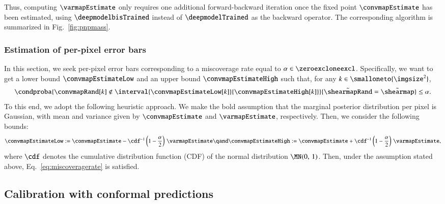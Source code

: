 \documentclass{aa}
\begin{document}
Thus, computing $\varmapEstimate$ only requires one additional forward-backward iteration once the fixed point $\convmapEstimate$ has been estimated, using $\deepmodelbisTrained$ instead of $\deepmodelTrained$ as the backward operator. The corresponding algorithm is summarized in Fig.~\ref{fig:pnpmass}.


\subsubsection{Estimation of per-pixel error bars}
\label{subsubsec:uq_mn_errbars}

In this section, we seek per-pixel error bars corresponding to a miscoverage rate equal to $\alpha \in \zeroexcloneexcl$. Specifically, we want to get a lower bound $\convmapEstimateLow$ and an upper bound $\convmapEstimateHigh$ such that, for any $k \in \smalloneto{\imgsize^2}$,
\begin{equation}
    \condproba{\convmapRand[k] \notin \interval{\convmapEstimateLow[k]}{\convmapEstimateHigh[k]}}{\tilde\shearmapRand = \tilde\shearmap} \leq \alpha.
\label{eq:miscoveragerate}
\end{equation}
To this end, we adopt the following heuristic approach. We make the bold assumption that the marginal posterior distribution per pixel is Gaussian, with mean and variance given by $\convmapEstimate$ and $\varmapEstimate$, respectively. Then, we consider the following bounds:
\begin{equation}
    \convmapEstimateLow := \convmapEstimate - \cdf^{-1}\left(
        1 - \frac{\alpha}{2}
    \right) \, \varmapEstimate
    \qand
    \convmapEstimateHigh := \convmapEstimate + \cdf^{-1}\left(
        1 - \frac{\alpha}{2}
    \right) \, \varmapEstimate,
\label{eq:errbars}
\end{equation}
where $\cdf$ denotes the cumulative distribution function (CDF) of the normal distribution $\MN(0,\, 1)$. Then, under the assumption stated above, Eq.~\eqref{eq:miscoveragerate} is satisfied.

\subsection{Calibration with conformal predictions}
\label{subsec:uq_cqr}
\end{document}
